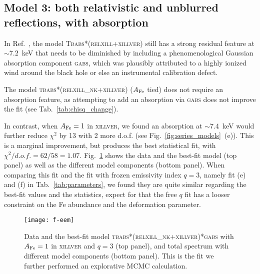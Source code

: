 \documentclass[11pt,a4paper,pdftex]{article}
\begin{document}
\subsection{Model 3: both relativistic and unblurred reflections, with absorption}\label{model3}

In Ref.~\cite{javier_gx339}, the model \textsc{Tbabs*(relxill+xillver)} still has a strong residual feature at $\sim7.2$~keV that needs to be diminished by including a phenomenological Gaussian absorption component \textsc{gabs}, which was plausibly attributed to a highly ionized wind around the black hole or else an instrumental calibration defect.


The model \textsc{tbabs*(relxill\_nk+xillver)} ($A_{\rm Fe}$ tied) does not require an absorption feature, as attempting to add an absorption via \textsc{gabs} does not improve the fit (see Tab.~\ref{tab:chisq_change}). 


In contrast, when $A_{\rm Fe}=1$ in \textsc{xillver}, we found an absorption at $\sim7.4$~keV would further reduce $\chi^2$ by 13 with 2 more d.o.f. (see Fig.~\ref{fig:series_models}~(e)). This is a marginal improvement, but produces the best statistical fit, with $\chi^2/d.o.f.=62/58=1.07$. Fig.~\ref{f-datamodel} shows the data and the best-fit model (top panel) as well as the different model components (bottom panel). When comparing this fit and the fit with frozen emissivity index $q=3$, namely fit (e) and (f) in Tab.~\ref{tab:parameters}, we found they are quite similar regarding the best-fit values and the statistics, expect for that the free $q$ fit has a looser constraint on the Fe abundance and the deformation parameter. 


\begin{figure}[t]
\begin{center}
\texttt{[image: f-eem]}
\end{center}
\vspace{-0.1cm}
\caption{Data and the best-fit model \textsc{tbabs*(relxill\_nk+xillver)*gabs} with $A_{\rm Fe}=1$ in \textsc{xillver} and $q=3$ (top panel), and total spectrum with different model components (bottom panel). This is the fit we further performed an explorative MCMC calculation. \label{f-datamodel}}
\end{figure}
\end{document}
